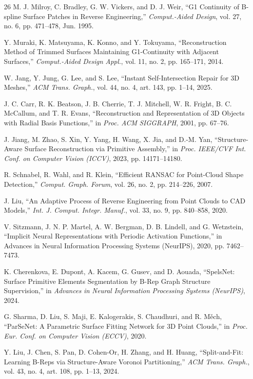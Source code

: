 \documentclass{ieeeaccess}
\begin{document}
\begin{thebibliography}{26}
M. J. Milroy, C. Bradley, G. W. Vickers, and D. J. Weir,
``G1 Continuity of B-spline Surface Patches in Reverse Engineering,''
\emph{Comput.-Aided Design}, vol. 27, no. 6, pp. 471--478, Jun. 1995.

Y. Muraki, K. Matsuyama, K. Konno, and Y. Tokuyama,
``Reconstruction Method of Trimmed Surfaces Maintaining G1-Continuity with Adjacent Surfaces,''
\emph{Comput.-Aided Design Appl.}, vol. 11, no. 2, pp. 165--171, 2014.

W. Jang, Y. Jung, G. Lee, and S. Lee,
``Instant Self-Intersection Repair for 3D Meshes,''
\emph{ACM Trans. Graph.}, vol. 44, no. 4, art. 143, pp. 1--14, 2025.

J. C. Carr, R. K. Beatson, J. B. Cherrie, T. J. Mitchell, W. R. Fright, B. C. McCallum, and T. R. Evans,
``Reconstruction and Representation of 3D Objects with Radial Basis Functions,''
in \emph{Proc. ACM SIGGRAPH}, 2001, pp. 67--76.

J. Jiang, M. Zhao, S. Xin, Y. Yang, H. Wang, X. Jia, and D.-M. Yan,
``Structure-Aware Surface Reconstruction via Primitive Assembly,''
in \emph{Proc. IEEE/CVF Int. Conf. on Computer Vision (ICCV)}, 2023, pp. 14171--14180.

R. Schnabel, R. Wahl, and R. Klein,
``Efficient RANSAC for Point-Cloud Shape Detection,''
\emph{Comput. Graph. Forum}, vol. 26, no. 2, pp. 214--226, 2007.

J. Liu,
``An Adaptive Process of Reverse Engineering from Point Clouds to CAD Models,''
\emph{Int. J. Comput. Integr. Manuf.}, vol. 33, no. 9, pp. 840--858, 2020.

V. Sitzmann, J. N. P. Martel, A. W. Bergman, D. B. Lindell, and G. Wetzstein,
``Implicit Neural Representations with Periodic Activation Functions,''
in Advances in Neural Information Processing Systems (NeurIPS), 2020, pp. 7462--7473.

K. Cherenkova, E. Dupont, A. Kacem, G. Gusev, and D. Aouada,
``SpelsNet: Surface Primitive Elements Segmentation by B-Rep Graph Structure Supervision,''
in \emph{Advances in Neural Information Processing Systems (NeurIPS)}, 2024.

G. Sharma, D. Liu, S. Maji, E. Kalogerakis, S. Chaudhuri, and R. M\v{e}ch,
``ParSeNet: A Parametric Surface Fitting Network for 3D Point Clouds,''
in \emph{Proc. Eur. Conf. on Computer Vision (ECCV)}, 2020.

Y. Liu, J. Chen, S. Pan, D. Cohen-Or, H. Zhang, and H. Huang,
``Split-and-Fit: Learning B-Reps via Structure-Aware Voronoi Partitioning,''
\emph{ACM Trans. Graph.}, vol. 43, no. 4, art. 108, pp. 1--13, 2024.


\end{thebibliography}
\end{document}
